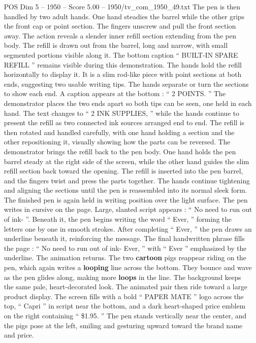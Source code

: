 \begin{textsample}{POS Dim 5 – 1950 – Score 5.00 – 1950/tv\_com\_1950\_49.txt}
The pen is then handled by two adult hands.
One hand steadies the barrel while the other grips the front cap or point section.
The fingers unscrew and pull the front section away.
The action reveals a slender inner refill section extending from the pen body.
The refill is drawn out from the barrel, long and narrow, with small segmented portions visible along it.
The bottom caption “ BUILT-IN SPARE REFILL ” remains visible during this demonstration.
The hands hold the refill horizontally to display it.
It is a slim rod-like piece with point sections at both ends, suggesting two usable writing tips.
The hands separate or turn the sections to show each end.
A caption appears at the bottom : “ 2 POINTS. ” The demonstrator places the two ends apart so both tips can be seen, one held in each hand.
The text changes to “ 2 INK SUPPLIES, ” while the hands continue to present the refill as two connected ink sources arranged end to end.
The refill is then rotated and handled carefully, with one hand holding a section and the other repositioning it, visually showing how the parts can be reversed.
The demonstrator brings the refill back to the pen body.
One hand holds the pen barrel steady at the right side of the screen, while the other hand guides the slim refill section back toward the opening.
The refill is inserted into the pen barrel, and the fingers twist and press the parts together.
The hands continue tightening and aligning the sections until the pen is reassembled into its normal sleek form.
The finished pen is again held in writing position over the light surface.
The pen writes in cursive on the page.
Large, slanted script appears : “ No need to run out of ink- ”.
Beneath it, the pen begins writing the word “ Ever, ” forming the letters one by one in smooth strokes.
After completing “ Ever, ” the pen draws an underline beneath it, reinforcing the message.
The final handwritten phrase fills the page : “ No need to run out of ink- Ever, ” with “ Ever ” emphasized by the underline.
The animation returns.
The two \textbf{cartoon} pigs reappear riding on the pen, which again writes a \textbf{looping} line across the bottom.
They bounce and wave as the pen glides along, making more \textbf{loops} in the line.
The background keeps the same pale, heart-decorated look.
The animated pair then ride toward a large product display.
The screen fills with a bold “ PAPER MATE ” logo across the top, “ Capri ” in script near the bottom, and a dark heart-shaped price emblem on the right containing “ \$1.95. ” The pen stands vertically near the center, and the pigs pose at the left, smiling and gesturing upward toward the brand name and price.

\end{textsample}
